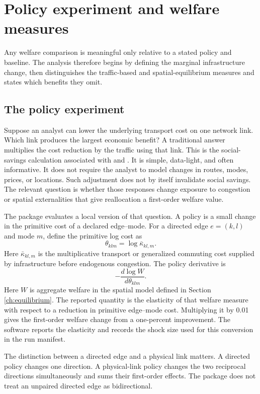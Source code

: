 \section{Policy experiment and welfare measures}
\label{ch:question}

Any welfare comparison is meaningful only relative to a stated policy and
baseline. The analysis therefore begins by defining the marginal
infrastructure change, then distinguishes the traffic-based and
spatial-equilibrium measures and states which benefits they omit.

\subsection{The policy experiment}

Suppose an analyst can lower the underlying transport cost on one network
link. Which link produces the largest economic benefit? A traditional answer
multiplies the cost reduction by the traffic using that link. This is the
social-savings calculation associated with \citet{fogel1962quantitative} and
\citet{Fogel1964Railroads}. It is simple, data-light, and often informative.
It does not require the analyst to model changes in routes, modes, prices, or
locations. Such adjustment does not by itself invalidate social savings. The
relevant question is whether those responses change exposure to congestion or
spatial externalities that give reallocation a first-order welfare value.

The package evaluates a local version of that question. A policy is a small
change in the primitive cost of a declared edge--mode. For a directed edge
\(e=(k,l)\) and mode \(m\), define the primitive log cost as
\[
  \theta_{klm}=\log\bar\kappa_{kl,m}.
\]
Here \(\bar\kappa_{kl,m}\) is the multiplicative transport or generalized
commuting cost supplied by infrastructure before endogenous congestion. The
policy derivative is
\[
  -\frac{d\log W}{d\theta_{klm}}.
\]
Here \(W\) is aggregate welfare in the spatial model defined in Section
\ref{ch:equilibrium}. The reported quantity is the elasticity of that welfare
measure with respect to a reduction in primitive edge--mode cost. Multiplying
it by 0.01 gives the first-order welfare change from a one-percent improvement.
The software reports the elasticity and records the shock size used for this
conversion in the run manifest.

The distinction between a directed edge and a physical link matters. A
directed policy changes one direction. A physical-link policy changes the two
reciprocal directions simultaneously and sums their first-order effects. The
package does not treat an unpaired directed edge as bidirectional.

